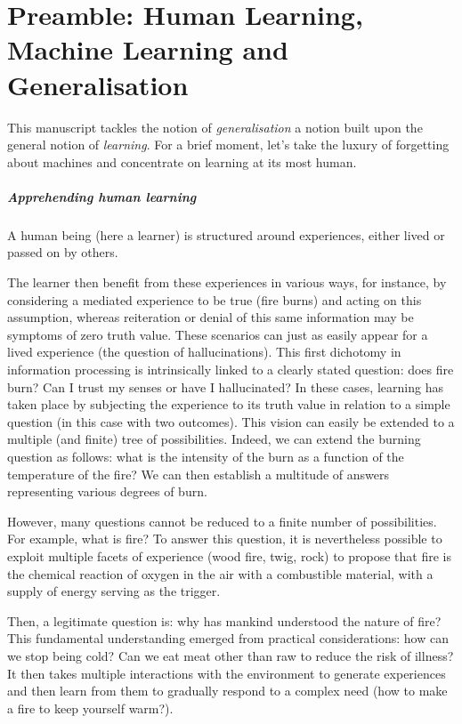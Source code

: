 \chapter*{Preamble: Human Learning, Machine Learning and Generalisation}
\mtcaddchapter



This manuscript tackles the notion of \emph{generalisation} a notion built upon the general notion of \emph{learning}. For a brief moment, let's take the luxury of forgetting about machines and concentrate on learning at its most human. 

\paragraph{Apprehending human learning} A human being (here a learner) is structured around experiences, either lived or passed on by others. 

The learner then benefit from these experiences in various ways, for instance, by considering a mediated experience to be true (fire burns) and acting on this assumption, whereas reiteration or denial of this same information may be symptoms of zero truth value.  These scenarios can just as easily appear for a lived experience (the question of hallucinations). This first dichotomy in information processing is intrinsically linked to a clearly stated question: does fire burn? Can I trust my senses or have I hallucinated? In these cases, learning has taken place by subjecting the experience to its truth value in relation to a simple question (in this case with two outcomes).  This vision can easily be extended to a multiple (and finite) tree of possibilities. Indeed, we can extend the burning question as follows: what is the intensity of the burn as a function of the temperature of the fire? We can then establish a multitude of answers representing various degrees of burn. 

However, many questions cannot be reduced to a finite number of possibilities. For example, what is fire? To answer this question, it is nevertheless possible to exploit multiple facets of experience (wood fire, twig, rock) to propose that fire is the chemical reaction of oxygen in the air with a combustible material, with a supply of energy serving as the trigger. 

Then, a legitimate question is: why has mankind understood the nature of fire? This fundamental understanding emerged from practical considerations: how can we stop being cold? Can we eat meat other than raw to reduce the risk of illness? It then takes multiple interactions with the environment to generate experiences and then learn from them to gradually respond to a complex need (how to make a fire to keep yourself warm?).

